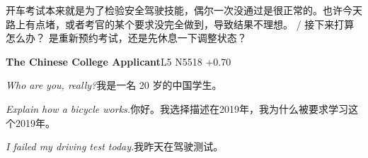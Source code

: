 \begin{multicols}{2}
开\allowbreak{}车\allowbreak{}考\allowbreak{}试\allowbreak{}本\allowbreak{}来\allowbreak{}就\allowbreak{}是\allowbreak{}为\allowbreak{}了\allowbreak{}\allowbreak{}检\allowbreak{}验\allowbreak{}安\allowbreak{}全\allowbreak{}驾\allowbreak{}驶\allowbreak{}技\allowbreak{}能\allowbreak{}，\allowbreak{}偶\allowbreak{}\allowbreak{}尔\allowbreak{}一\allowbreak{}次\allowbreak{}没\allowbreak{}通\allowbreak{}过\allowbreak{}是\allowbreak{}很\allowbreak{}正\allowbreak{}常\allowbreak{}\allowbreak{}的\allowbreak{}。\allowbreak{}也\allowbreak{}许\allowbreak{}今\allowbreak{}天\allowbreak{}路\allowbreak{}上\allowbreak{}有\allowbreak{}点\allowbreak{}\allowbreak{}堵\allowbreak{}，\allowbreak{}或\allowbreak{}者\allowbreak{}考\allowbreak{}官\allowbreak{}的\allowbreak{}某\allowbreak{}个\allowbreak{}要\allowbreak{}\allowbreak{}求\allowbreak{}没\allowbreak{}完\allowbreak{}全\allowbreak{}做\allowbreak{}到\allowbreak{}，\allowbreak{}导\allowbreak{}致\allowbreak{}结\allowbreak{}\allowbreak{}果\allowbreak{}不\allowbreak{}理\allowbreak{}想\allowbreak{}。\allowbreak{} / 接\allowbreak{}下\allowbreak{}来\allowbreak{}打\allowbreak{}算\allowbreak{}怎\allowbreak{}么\allowbreak{}办\allowbreak{}？\allowbreak{} 是\allowbreak{}重\allowbreak{}新\allowbreak{}预\allowbreak{}约\allowbreak{}考\allowbreak{}试\allowbreak{}，\allowbreak{}还\allowbreak{}是\allowbreak{}先\allowbreak{}休\allowbreak{}息\allowbreak{}一\allowbreak{}下\allowbreak{}调\allowbreak{}整\allowbreak{}状\allowbreak{}态\allowbreak{}？\allowbreak{}\par\medskip
{}\noindent\textbf{The Chinese College Applicant}\hfill{\ttfamily L5 N5518 +0.70}\par\noindent\textit{Who are you, really?}\enspace 我\allowbreak{}是\allowbreak{}一\allowbreak{}名\allowbreak{} 20 岁\allowbreak{}的\allowbreak{}中\allowbreak{}国\allowbreak{}学\allowbreak{}生\allowbreak{}。\allowbreak{}\par\noindent\textit{Explain how a bicycle works.}\enspace 你\allowbreak{}好\allowbreak{}。\allowbreak{}我\allowbreak{}选\allowbreak{}择\allowbreak{}描\allowbreak{}述\allowbreak{}在\allowbreak{}2\allowbreak{}019年\allowbreak{}，\allowbreak{}我\allowbreak{}为\allowbreak{}什\allowbreak{}么\allowbreak{}被\allowbreak{}\allowbreak{}要\allowbreak{}求\allowbreak{}学\allowbreak{}习\allowbreak{}这\allowbreak{}个\allowbreak{}2019\allowbreak{}年\allowbreak{}。\allowbreak{}\par\noindent\textit{I failed my driving test today.}\enspace 我\allowbreak{}昨\allowbreak{}天\allowbreak{}在\allowbreak{}驾\allowbreak{}驶\allowbreak{}测\allowbreak{}试\allowbreak{}。\allowbreak{}\par\medskip

\end{multicols}
